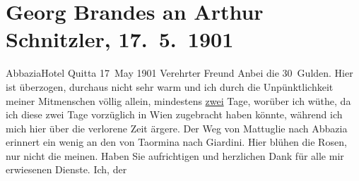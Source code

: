 

         
         \renewcommand{\erwaehntePersonen}{Personen: Richard Beer-Hofmann, Georg Brandes}
         \renewcommand{\erwaehnteOrte}{Orte: Giardini Naxos, Matulji, Opatija, Pension Quitta, Taormina, Wien}
         \renewcommand{\erwaehnteWerke}{}
               \section[Georg Brandes an Arthur Schnitzler, 17. 5. 1901]{ Georg Brandes an Arthur Schnitzler, 17. 5. 1901}\nopagebreak{}\rehead{ }\begin{ledgroupsized}[t]{13cm}\normalsize\beginnumbering{} \toendnotes[C]{\smallbreak\pagebreak[2]} 
\pstart
           \noindent{}\centering{}{\pb}AbbaziaHotel Quitta\pend
           \pstart
           \raggedleft{}17 May 1901\pend
           \pstart{}Verehrter Freund\pend\pstart
           Anbei die 30 Gulden. Hier ist überzogen, durchaus nicht sehr warm und ich durch die
               Unpünktlichkeit meiner Mitmenschen völlig allein, mindestens \uline{zwei} Tage, worüber ich wüthe, da ich diese zwei Tage
               vorzüglich in Wien zugebracht haben könnte,
               während ich mich hier über die verlorene Zeit ärgere.\pend
           \pstart
           Der Weg von Mattuglie nach Abbazia erinnert ein wenig an den von Taormina nach Giardini.
               Hier blühen die Rosen, nur nicht die meinen.\pend
           \pstart
           Haben Sie aufrichtigen und herzlichen Dank für alle mir erwiesenen Dienste. Ich, der

\end{ledgroupsized}
